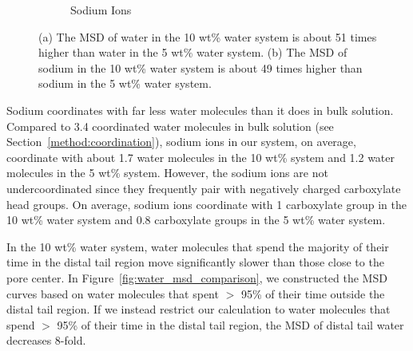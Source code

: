 \documentclass[journal=jpcbfk,manuscript=article]{achemso}
\begin{document}
\begin{figure}[!htb]
\begin{subfigure}{0.45\textwidth}
  \caption{Sodium Ions}\label{fig:na_msd_comparison}
  \end{subfigure}
  \caption{(a) The MSD of water in the 10 wt\% water system is about 51 times
  higher than water in the 5 wt\% water system. (b) The MSD of sodium in the
  10 wt\% water system is about 49 times higher than sodium in the 5 wt\% 
  water system.}\label{fig:msd_comparison}
  \end{figure}
  
  Sodium coordinates with far less water molecules than it does in bulk solution.
  Compared to 3.4 coordinated water molecules in bulk solution (see 
  Section~\ref{method:coordination}), sodium ions in our system, on average,
  coordinate with about 1.7 water molecules in the 10 wt\% system and 1.2 water
  molecules in the 5 wt\% system. However, the sodium ions are not undercoordinated
  since they frequently pair with negatively charged carboxylate head groups.
  On average, sodium ions coordinate with 1 carboxylate group in the 10 wt\% water
  system and 0.8 carboxylate groups in the 5 wt\% water system.
  
  In the 10 wt\% water system, water molecules that spend the majority of 
  their time in the distal tail region move significantly slower than those
  close to the pore center. In Figure~\ref{fig:water_msd_comparison}, we 
  constructed the MSD curves based on water molecules that spent $>$ 95\% of their
  time outside the distal tail region. If we instead restrict our calculation to
  water molecules that spend $>$ 95\% of their time in the distal tail region, 
  the MSD of distal tail water decreases 8-fold. 
\end{document}
